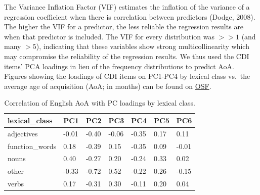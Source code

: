 \documentclass[10pt, letterpaper]{article}
\newenvironment{CodeChunk}{}{}
\begin{document}
The Variance Inflation Factor (VIF) estimates the inflation of the
variance of a regression coefficient when there is correlation between
predictors (Dodge, 2008). The higher the VIF for a predictor, the less
reliable the regression results are when that predictor is included. The
VIF for every distribution was \(>>1\) (and many \(>5\)), indicating
that these variables show strong multicollinearity which may compromise
the reliability of the regression results. We thus used the CDI items'
PCA loadings in lieu of the frequency distributions to predict AoA.
Figures showing the loadings of CDI items on PC1-PC4 by lexical class
vs.~the average age of acquisition (AoA; in months) can be found on
\href{https://osf.io/46gj2/?view_only=2db5950a96a44f289b6e778e60391662}{OSF}.

\begin{CodeChunk}



\begin{table}[h]

\begin{center}
\begin{threeparttable}

\caption{\label{tab:unnamed-chunk-4}Correlation of English AoA with PC loadings by lexical class.}

\begin{tabular}{lllllll}
\toprule
lexical\_class & \multicolumn{1}{c}{PC1} & \multicolumn{1}{c}{PC2} & \multicolumn{1}{c}{PC3} & \multicolumn{1}{c}{PC4} & \multicolumn{1}{c}{PC5} & \multicolumn{1}{c}{PC6}\\
\midrule
adjectives & -0.01 & -0.40 & -0.06 & -0.35 & 0.17 & 0.11\\
function\_words & 0.18 & -0.39 & 0.15 & -0.35 & 0.09 & -0.01\\
nouns & 0.40 & -0.27 & 0.20 & -0.24 & 0.33 & 0.02\\
other & -0.33 & -0.72 & 0.52 & -0.22 & 0.26 & -0.15\\
verbs & 0.17 & -0.31 & 0.30 & -0.11 & 0.20 & 0.04\\
\bottomrule
\end{tabular}

\end{threeparttable}
\end{center}

\end{table}


\end{CodeChunk}
\end{document}
